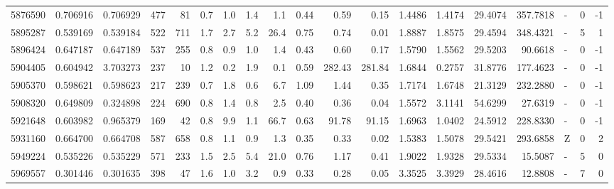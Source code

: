 \begin{tabular}{rrrrrrrrrrrrrrrrlrr}
   5876590 & 0.706916 &   0.706929 &  477 &   81 &      0.7 &      1.0 &     1.4 &      1.1 &       0.44 &        0.59 &        0.15 &  1.4486 &  1.4174 &   29.4074 &  357.7818 &             - &        0 &         -1 \\
   5895287 & 0.539169 &   0.539184 &  522 &  711 &      1.7 &      2.7 &     5.2 &     26.4 &       0.75 &        0.74 &        0.01 &  1.8887 &  1.8575 &   29.4594 &  348.4321 &             - &        5 &          1 \\
   5896424 & 0.647187 &   0.647189 &  537 &  255 &      0.8 &      0.9 &     1.0 &      1.4 &       0.43 &        0.60 &        0.17 &  1.5790 &  1.5562 &   29.5203 &   90.6618 &             - &        0 &         -1 \\
   5904405 & 0.604942 &   3.703273 &  237 &   10 &      1.2 &      0.2 &     1.9 &      0.1 &       0.59 &      282.43 &      281.84 &  1.6844 &  0.2757 &   31.8776 &  177.4623 &             - &        0 &         -1 \\
   5905370 & 0.598621 &   0.598623 &  217 &  239 &      0.7 &      1.8 &     0.6 &      6.7 &       1.09 &        1.44 &        0.35 &  1.7174 &  1.6748 &   21.3129 &  232.2880 &             - &        0 &         -1 \\
   5908320 & 0.649809 &   0.324898 &  224 &  690 &      0.8 &      1.4 &     0.8 &      2.5 &       0.40 &        0.36 &        0.04 &  1.5572 &  3.1141 &   54.6299 &   27.6319 &             - &        0 &         -1 \\
   5921648 & 0.603982 &   0.965379 &  169 &   42 &      0.8 &      9.9 &     1.1 &     66.7 &       0.63 &       91.78 &       91.15 &  1.6963 &  1.0402 &   24.5912 &  228.8330 &             - &        0 &         -1 \\
   5931160 & 0.664700 &   0.664708 &  587 &  658 &      0.8 &      1.1 &     0.9 &      1.3 &       0.35 &        0.33 &        0.02 &  1.5383 &  1.5078 &   29.5421 &  293.6858 &             Z &        0 &          2 \\
   5949224 & 0.535226 &   0.535229 &  571 &  233 &      1.5 &      2.5 &     5.4 &     21.0 &       0.76 &        1.17 &        0.41 &  1.9022 &  1.9328 &   29.5334 &   15.5087 &             - &        5 &          0 \\
   5969557 & 0.301446 &   0.301635 &  398 &   47 &      1.6 &      1.0 &     3.2 &      0.9 &       0.33 &        0.28 &        0.05 &  3.3525 &  3.3929 &   28.4616 &   12.8808 &             - &        7 &          0 \\

\end{tabular}
